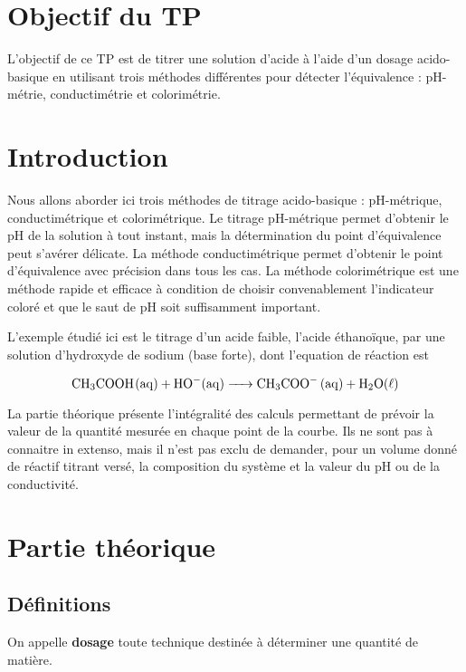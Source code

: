 \documentclass{tp}
\begin{document}


\section{Objectif du TP}
L'objectif de ce TP est de titrer une solution d'acide à l'aide d'un dosage acido-basique en utilisant trois méthodes différentes pour détecter l'équivalence : pH-métrie, conductimétrie et colorimétrie.

\section{Introduction}
Nous allons aborder ici trois méthodes de titrage acido-basique : pH-métrique, conductimétrique et colorimétrique. Le titrage pH-métrique permet d'obtenir le $\mathrm{pH}$ de la solution à tout instant, mais la détermination du point d'équivalence peut s'avérer délicate. La méthode conductimétrique permet d'obtenir le point d'équivalence avec précision dans tous les cas. La méthode colorimétrique est une méthode rapide et efficace à condition de choisir convenablement l'indicateur coloré et que le saut de $\mathrm{pH}$ soit suffisamment important.

L'exemple étudié ici est le titrage d'un acide faible, l'acide éthanoïque, par une solution d'hydroxyde de sodium (base forte), dont l'equation de réaction est

\begin{equation}
  \ce{CH3COOH(aq) + HO-(aq) -> CH3COO- (aq) + H2O(\ell)}
\end{equation}

La partie théorique présente l'intégralité des calculs permettant de prévoir la valeur de la quantité mesurée en chaque point de la courbe. Ils ne sont pas à connaitre in extenso, mais il n'est pas exclu de demander, pour un volume donné de réactif titrant versé, la composition du système et la valeur du pH ou de la conductivité.

\section{Partie théorique}%
\label{sec:partie_theorique}

\subsection{Définitions}%
\label{sub:definitions}

On appelle \textbf{dosage} toute technique destinée à déterminer une quantité de matière.
\end{document}

